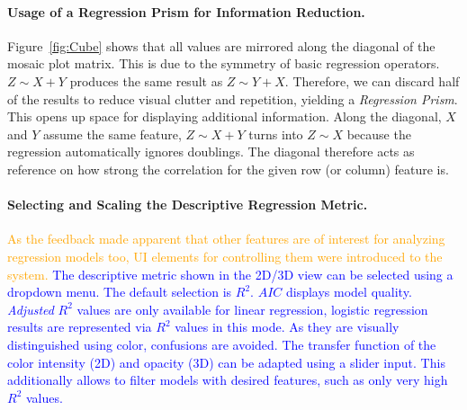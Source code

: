 \documentclass[journal]{style/vgtc} 			          %
\newcommand{\add}[1]{\textcolor{blue}{#1}}
\newcommand{\design}[1]{\textcolor{orange}{#1}}
\begin{document}
\paragraph{Usage of a Regression Prism for Information Reduction.}
Figure~\ref{fig:Cube} shows that all values are mirrored along the diagonal of the mosaic plot matrix.
This is due to the symmetry of basic regression operators.
$Z \sim X + Y$ produces the same result as $Z \sim Y + X$.
Therefore, we can discard half of the results to reduce visual clutter and repetition, yielding a \emph{Regression Prism}.
This opens up space for displaying additional information.
Along the diagonal, $X$ and $Y$ assume the same feature, $Z \sim X + Y$ turns into $Z \sim X$ because the regression automatically ignores doublings.
The diagonal therefore acts as reference on how strong the correlation for the given row (or column) feature is.

\paragraph{Selecting and Scaling the Descriptive Regression Metric.}
\design{
As the feedback made apparent that other features are of interest for analyzing regression models too, UI elements for controlling them were introduced to the system.
}
\add{
The descriptive metric shown in the 2D/3D view can be selected using a dropdown menu.
The default selection is $R^2$.
$AIC$ displays model quality.
\emph{Adjusted} $R^2$ values are only available for linear regression, logistic regression results are represented via $R^2$ values in this mode.
As they are visually distinguished using color, confusions are avoided.
The transfer function of the color intensity (2D) and opacity (3D) can be adapted using a slider input.
This additionally allows to filter models with desired features, such as only very high $R^2$ values.
}
\end{document}
